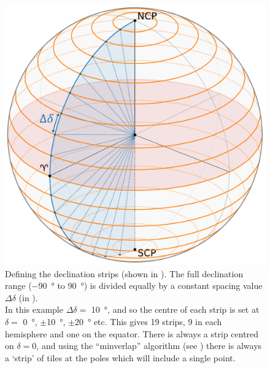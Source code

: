 \begin{colsection}
\begin{colsection}
\clearpage

\begin{figure}[t]
    \begin{center}
        \includegraphics[width=\linewidth]{images/globe2.pdf}
    \end{center}
    \caption[Defining declination strips]{
        Defining the declination strips (shown in ). The full declination range (\SI{-90}{\degree} to \SI{90}{\degree}) is divided equally by a constant spacing value $\Delta\delta$ (in ). \\
        In this example $\Delta\delta =$ \SI{10}{\degree}, and so the centre of each strip is set at $\delta=$ \SI{0}{\degree}, $\pm$\SI{10}{\degree}, $\pm$\SI{20}{\degree} etc. This gives 19 strips, 9 in each hemisphere and one on the equator. There is always a strip centred on $\delta=0$, and using the ``minverlap'' algorithm (see ) there is always a `strip' of tiles at the poles which will include a single point.
    }\label{fig:deltadelta}
\end{figure}

\clearpage


\end{colsection}
\end{colsection}
